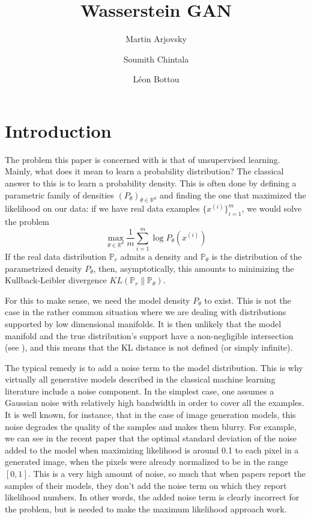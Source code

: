\documentclass{article} %
\title{Wasserstein GAN}
\author[1]{Martin Arjovsky}
\author[2]{Soumith Chintala}
\author[1,2]{L\'eon Bottou}
\affil[1]{Courant Institute of Mathematical Sciences}
\affil[2]{Facebook AI Research}
\date{}
\newcommand\PP{\mathbb{P}}
\newcommand\RR{\mathbb{R}}
\theoremstyle{definition}
\theoremstyle{definition}
\begin{document}
\maketitle


\section{Introduction}
The problem this paper is concerned with is that of unsupervised learning.
Mainly, what does it mean to learn a probability
distribution? The classical answer to this is to learn a probability
density. This is often done by defining a parametric family of densities
$(P_\theta)_{\theta \in \RR^d}$ and finding the one that maximized the likelihood on our data:
if we have real data examples $\{x^{(i)}\}_{i=1}^m$, we would solve the problem
\begin{equation*}
\max_{\theta \in \RR^d} \frac{1}{m}\sum_{i=1}^m \log P_\theta(x^{(i)})
\end{equation*}
If the real data distribution $\PP_r$ admits a density and $\PP_\theta$ is the
distribution of the parametrized density $P_\theta$, then, asymptotically, this
amounts to minimizing the Kullback-Leibler divergence $KL(\PP_r \| \PP_\theta)$.

For this to make sense, we need the model density $P_\theta$ to exist.
This is not the case in the rather common situation where we are
dealing with distributions supported by low dimensional manifolds.
It is then unlikely that the model manifold and the true distribution's support
have a non-negligible intersection (see \cite{Arj-ea-Princ}),
and this means that the KL distance is not defined (or simply infinite).

The typical remedy is to add a noise term to the model
distribution. This is why virtually all generative models described in
the classical machine learning literature include a noise
component. In the simplest case, one assumes a Gaussian noise with
relatively high bandwidth in order to cover all the examples. It is
well known, for instance, that in the case of image generation models,
this noise degrades the quality of the samples and makes them
blurry.
For example, we can see in the recent paper \cite{Wu-ea-AIS}
that the optimal standard deviation of the noise added to the model
when maximizing likelihood is around 0.1 to each pixel in a generated image,
when the pixels were already normalized to be in the range $[0, 1]$. This is
a very high amount of noise, so much that when papers report the samples of
their models, they don't add the noise term on which they report likelihood numbers.
In other words, the added noise term
is clearly incorrect for the problem, but is needed to make the
maximum likelihood approach work.
\end{document}
